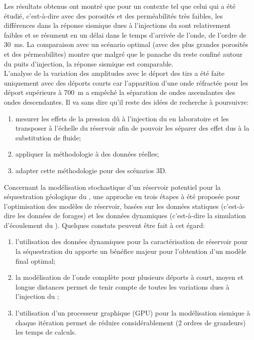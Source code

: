 Les résultats obtenus ont montré que pour un contexte tel que celui qui a été étudié,
c'est-à-dire avec des porosités et des perméabilités très faibles, les différences
dans la réponse sismique dues à l'injections du  sont relativement faibles
et se résument en un délai dans le temps d'arrivée de l'onde, de l'ordre de
\SI{30}{\milli\second}. La comparaison avec un scénario optimal (avec des plus grandes porosités et des pérmeabilites) montre que malgré que le panache du  reste confiné autour du puits d'injection, la réponse sismique est comparable.\\
L'analyse de la variation des amplitudes avec le déport
des tirs a été faite uniquement avec des déports courts car l'apparition d'une onde
réfractée pour les déport supérieurs à \SI{700}{\metre} a empêché la séparation de
ondes ascendantes des ondes descendantes. Il va sans dire qu'il reste des idées
de recherche à poursuivre:
\begin{enumerate}[-]
\item mesurer les effets de la pression dû à l'injection du  en
laboratoire et les transposer à l'échelle du réservoir afin de pouvoir les séparer
des effet dus à la substitution de fluide;
\item appliquer la méthodologie à des données réelles;
\item adapter cette méthodologie pour des scénarios 3D.
\end{enumerate}
\vspace{10 mm}
Concernant la modélisation stochastique d'un réservoir potentiel pour la
séquestration géologique du , une approche en trois étapes à été proposée
pour l'optimisation des modèles de réservoir, basées sur les données statiques
(c'est-à-dire les données de forages) et les données dynamiques (c'est-à-dire la simulation
d'écoulement du ). Quelques constats peuvent être fait à cet égard:
\begin{enumerate}[-]
\item l'utilisation des données dynamiques pour la caractérisation de réservoir
pour la séquestration du  apporte un bénéfice majeur pour l'obtention
d'un modèle final optimal;
\item la modélisation de l'onde complète pour plusieurs déports à court, moyen
et longue distances permet de tenir compte de toutes les variations dues à l'injection
du ;
\item l'utilisation d'un processeur graphique (GPU) pour la modélisation sismique à
chaque itération permet de réduire considérablement (\num{2} ordres de
grandeurs) les temps de calculs.
\end{enumerate}

